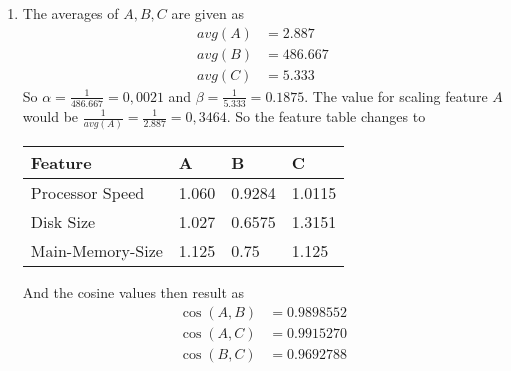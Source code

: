 \begin{enumerate}[label=(\alph*)]
    \item The averages of $A, B, C$ are given as
    \begin{align*}
        avg(A) &= 2.887 \\
        avg(B) &= 486.667 \\
        avg(C) &= 5.333
    \end{align*}
    So $\alpha = \frac{1}{486.667} = 0,0021$ and $\beta = \frac{1}{5.333} = 0.1875$. The value for scaling feature $A$ would be $\frac{1}{avg(A)} = \frac{1}{2.887} = 0,3464$. So the feature table changes to
    \begin{table}[!htb]
        \centering
        \begin{tabular}{llll}
        \hline
        \textbf{Feature} & \textbf{A} & \textbf{B} & \textbf{C} \\ \hline
        Processor Speed  & 1.060      & 0.9284      & 1.0115       \\
        Disk Size        & 1.027      & 0.6575        & 1.3151        \\
        Main-Memory-Size & 1.125          & 0.75        & 1.125          \\ \hline
        \end{tabular}
    \end{table}

    And the cosine values then result as 
    \begin{align*}
        \cos(A,B) &= 0.9898552 \\
        \cos(A,C) &= 0.9915270 \\
        \cos(B,C) &= 0.9692788
    \end{align*}
    
\end{enumerate}




